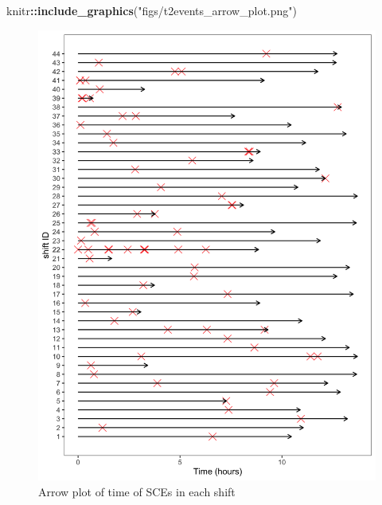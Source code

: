 \documentclass[]{article}
\newenvironment{Shaded}{\begin{snugshade}}{\end{snugshade}}
\newcommand{\KeywordTok}[1]{\textcolor[rgb]{0.13,0.29,0.53}{\textbf{#1}}}
\newcommand{\NormalTok}[1]{#1}
\newcommand{\OperatorTok}[1]{\textcolor[rgb]{0.81,0.36,0.00}{\textbf{#1}}}
\newcommand{\StringTok}[1]{\textcolor[rgb]{0.31,0.60,0.02}{#1}}
\begin{document}
\begin{Shaded}
\begin{Highlighting}[]
\NormalTok{knitr}\OperatorTok{::}\KeywordTok{include_graphics}\NormalTok{(}\StringTok{"figs/t2events_arrow_plot.png"}\NormalTok{)}
\end{Highlighting}
\end{Shaded}

\begin{figure}
\includegraphics[width=25in]{figs/t2events_arrow_plot} \caption{Arrow plot of time of SCEs in each shift}\label{fig:unnamed-chunk-6}
\end{figure}
\end{document}
